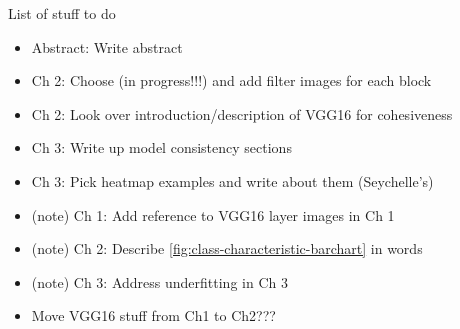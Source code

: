 
List of stuff to do

\begin{itemize}
\item Abstract: Write abstract
\item Ch 2: Choose (in progress!!!) and add filter images for each block
\item Ch 2: Look over introduction/description of VGG16 for cohesiveness
\item Ch 3: Write up model consistency sections
\item Ch 3: Pick heatmap examples and write about them (Seychelle's)

\item (\fix note) Ch 1: Add reference to VGG16 layer images in Ch 1
\item (\fix note) Ch 2: Describe \autoref{fig:class-characteristic-barchart} in words
\item (\fix note) Ch 3: Address underfitting in Ch 3

\item Move VGG16 stuff from Ch1 to Ch2???
\end{itemize}
